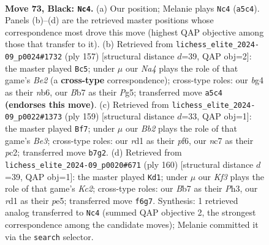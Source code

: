\documentclass[11pt]{article}
\begin{document}
\clearpage

\begin{figure}[p]\centering
\begin{subfigure}{0.46\textwidth}\centering
\resizebox{\linewidth}{!}{%
\newchessgame
\chessboard[
  setfen={8/PbN5/5k2/n7/1p3PB1/6P1/7P/3R1K2 b - - 15 73},
  showmover=false,
  pgfstyle=straightmove, color=movearrow, markmove={a5-c4}
]}
\caption{}
\end{subfigure}\hfill
\begin{subfigure}{0.46\textwidth}\centering
\resizebox{\linewidth}{!}{%
\newchessgame
\chessboard[
  setfen={8/4b3/1N2k3/pP4p1/P3P1P1/2K5/8/8 b - - 0 79},
  showmover=false,
  pgfstyle=straightmove, color=movearrow, markmove={e7-c5}
]}
\caption{}
\end{subfigure}
\\[4pt]
\begin{subfigure}{0.46\textwidth}\centering
\resizebox{\linewidth}{!}{%
\newchessgame
\chessboard[
  setfen={4k3/6K1/p1p1bP2/2B5/1P6/3P4/2P5/8 b - - 6 80},
  showmover=false,
  pgfstyle=straightmove, color=movearrow, markmove={e6-f7}
]}
\caption{}
\end{subfigure}\hfill
\begin{subfigure}{0.46\textwidth}\centering
\resizebox{\linewidth}{!}{%
\newchessgame
\chessboard[
  setfen={8/5p2/6p1/4p1Bp/4k3/7P/2K3P1/8 w - - 2 81},
  showmover=false,
  pgfstyle=straightmove, color=movearrow, markmove={c2-d1}
]}
\caption{}
\end{subfigure}
\caption{\textbf{Move 73, Black: \texttt{Nc4}.} (a) Our position; Melanie plays \texttt{Nc4} (\texttt{a5c4}). Panels (b)--(d) are the retrieved master positions whose correspondence most drove this move (highest QAP objective among those that transfer to it). (b) Retrieved from \texttt{lichess\_elite\_2024-09\_p0024\#1732} (ply 157) [structural distance $d$=39, QAP obj=2]: the master played \texttt{Bc5}; under $\mu$ our \emph{Na4} plays the role of that game's \emph{Be2} (a \textbf{cross-type} correspondence); cross-type roles: our \emph{b}g4 as their \emph{n}b6, our \emph{B}b7 as their \emph{P}g5; transferred move \texttt{a5c4} \textbf{(endorses this move)}. (c) Retrieved from \texttt{lichess\_elite\_2024-09\_p0022\#1373} (ply 159) [structural distance $d$=33, QAP obj=1]: the master played \texttt{Bf7}; under $\mu$ our \emph{Bb2} plays the role of that game's \emph{Be3}; cross-type roles: our \emph{r}d1 as their \emph{p}f6, our \emph{n}c7 as their \emph{p}c2; transferred move \texttt{b7g2}. (d) Retrieved from \texttt{lichess\_elite\_2024-09\_p0020\#671} (ply 160) [structural distance $d$=39, QAP obj=1]: the master played \texttt{Kd1}; under $\mu$ our \emph{Kf3} plays the role of that game's \emph{Kc2}; cross-type roles: our \emph{B}b7 as their \emph{P}h3, our \emph{r}d1 as their \emph{p}e5; transferred move \texttt{f6g7}. Synthesis: 1 retrieved analog transferred to \texttt{Nc4} (summed QAP objective 2, the strongest correspondence among the candidate moves); Melanie committed it via the \texttt{search} selector.}
\label{fig:thought-m145}
\end{figure}
\end{document}

